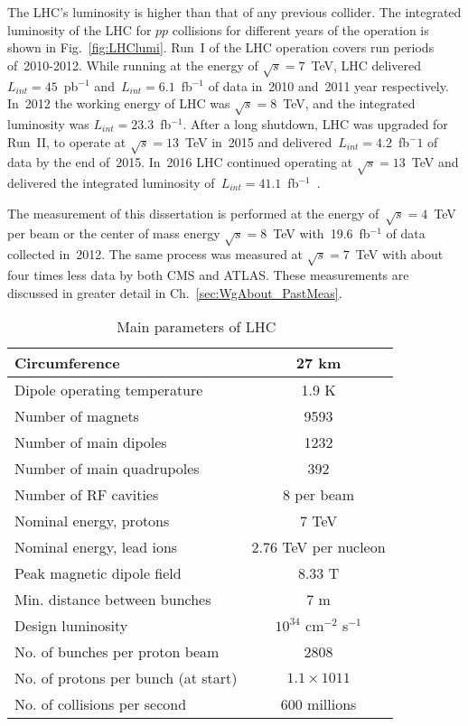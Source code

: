 The LHC's luminosity is higher than that of any previous collider. The integrated luminosity of the LHC for $pp$ collisions for different years of the operation is shown in Fig.~\ref{fig:LHClumi}. Run~I of the LHC operation covers run periods of~2010-2012. While running at the energy of $\sqrt{s}=7$~TeV, LHC delivered~$L_{int}=45$~pb$^{-1}$ and~$L_{int}=6.1$~fb$^{-1}$ of data in~2010 and~2011 year respectively. In~2012 the working energy of LHC was $\sqrt{s}=8$~TeV, and the integrated luminosity was $L_{int}=23.3$~fb$^{-1}$.  After a long shutdown, LHC was upgraded for Run~II, to operate at $\sqrt{s}=13$~TeV in~2015 and delivered~$L_{int}=4.2$~fb$^-1$ of data by the end of~2015. In~2016 LHC continued operating at $\sqrt{s}=13$~TeV and delivered the integrated luminosity of~$L_{int}=41.1$~fb$^{-1}$~\cite{ref_LHClumi_twiki}.

The measurement of this dissertation is performed at the energy of~$\sqrt{s}=4$~TeV per beam or the center of mass energy $\sqrt{s}=8$~TeV with~19.6~fb$^{-1}$ of data collected in~2012. The same process was measured at $\sqrt{s}=7$~TeV with about four times less data by both CMS and ATLAS. These measurements are discussed in greater detail in Ch.~\ref{sec:WgAbout_PastMeas}.

\begin{table}[h]
  \begin{center}
  \caption{ Main parameters of LHC~\cite{ref_LHC_brochure}}
  \vspace{5 mm}
  \begin{tabular}{|l|c|}
     \hline
     Circumference & 27 km  \\ \hline
     Dipole operating temperature &  1.9 K \\ \hline
     Number of magnets &  9593 \\ \hline
     Number of main dipoles &  1232 \\ \hline
     Number of main quadrupoles &  392 \\ \hline
     Number of RF cavities &  8 per beam \\ \hline
     Nominal energy, protons &  7 TeV \\ \hline
     Nominal energy, lead ions &  2.76 TeV per nucleon \\ \hline
     Peak magnetic dipole field &  8.33 T \\ \hline
     Min. distance between bunches &  7 m \\ \hline
     Design luminosity &  $10^{34}$ cm$^{-2}$ s$^{-1}$ \\ \hline
     No. of bunches per proton beam &  2808 \\ \hline
     No. of protons per bunch (at start) &  $1.1\times 10{11}$ \\ \hline
     No. of collisions per second &  600 millions \\ \hline
  \end{tabular}
  \label{tab:LHCparameters}
  \end{center}
\end{table}

